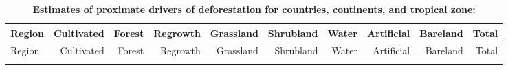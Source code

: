 	\begin{scriptsize}
	\begin{landscape}
		\begin{center}
			\begin{longtable}[ht]{lrrrrrrrrr}
			\caption[Estimates of proximate drivers of deforestation for countries, continents, and tropical zone]{\textbf{Estimates of proximate drivers of deforestation for countries, continents, and tropical zone:}} \label{tab:test}\\

			\hline
			Region&Cultivated&Forest&Regrowth&Grassland&Shrubland&Water&Artificial&Bareland&Total\\
			\hline
			\endfirsthead

			\hline
			Region&Cultivated&Forest&Regrowth&Grassland&Shrubland&Water&Artificial&Bareland&Total\\
			\hline
			\endhead

			\hline
			\endfoot


\end{longtable}
\end{center}
\end{landscape}
\end{scriptsize}
